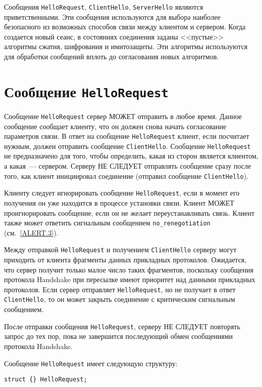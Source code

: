 Сообщения \lstinline{HelloRequest}, \lstinline{ClientHello},
\lstinline{ServerHello} являются приветственными. Эти сообщения
используются для выбора наиболее безопасного из возможных способов связи
между клиентом и сервером. Когда создается новый сеанс, в состояниях
соединения заданы <<пустые>> алгоритмы сжатия, шифрования и имитозащиты.
Эти алгоритмы используются для обработки сообщений вплоть до согласования
новых алгоритмов.

\section{Сообщение \lstinline{HelloRequest}}\label{HANDSHAKE.4}

Сообщение \lstinline{HelloRequest} сервер МОЖЕТ отправить в любое время.
Данное сообщение сообщает клиенту, что он должен снова начать согласование
параметров связи. В ответ на сообщение \lstinline{HelloRequest} клиент,
если посчитает нужным, должен отправить сообщение \lstinline{ClientHello}.
Сообщение \lstinline{HelloRequest} не предназначено для того, чтобы
определить, какая из сторон является клиентом, а какая~--- сервером. Серверу
НЕ СЛЕДУЕТ отправлять сообщение сразу после того, как клиент инициировал
соединение (отправил сообщение \lstinline{ClientHello}).

Клиенту следует игнорировать сообщение \lstinline{HelloRequest}, если в
момент его получения он уже находится в процессе установки связи. Клиент
МОЖЕТ проигнорировать сообщение, если он не желает переустанавливать связь.
Клиент также может ответить сигнальным сообщением
\lstinline{no_renegotiation} (см.~\ref{ALERT.3}).

Между отправкой \lstinline{HelloRequest}  и получением
\lstinline{ClientHello} серверу могут приходить от клиента фрагменты данных
прикладных протоколов. Ожидается, что сервер получит только малое число
таких фрагментов, поскольку сообщения протокола Handshake при
пересылке имеют приоритет над данными прикладных протоколов. Если сервер
отправляет \lstinline{HelloRequest}, но не получает в ответ
\lstinline{ClientHello}, то он может закрыть соединение с критическим
сигнальным сообщением.

После отправки сообщения \lstinline{HelloRequest}, серверу НЕ СЛЕДУЕТ
повторять запрос до тех пор, пока не завершится последующий обмен
сообщениями протокола Handshake.

Сообщение \lstinline{HelloRequest} имеет следующую структуру:

\begin{lstlisting}
struct {} HelloRequest;
\end{lstlisting}


